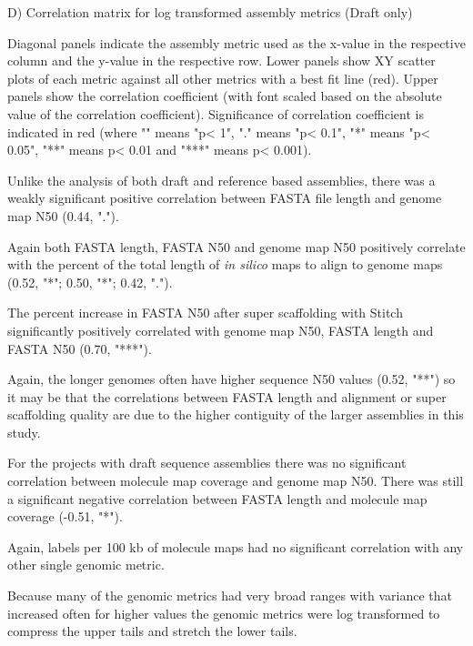 D) Correlation matrix for log transformed assembly metrics (Draft only)

Diagonal panels indicate the assembly metric used as the x-value in the respective column and the y-value in the respective row. Lower panels show XY scatter plots of each metric against all other metrics with a best fit line (red). Upper panels show the correlation coefficient (with font scaled based on the absolute value of the correlation coefficient). Significance of correlation coefficient is indicated in red (where "" means "p< 1", "." means "p< 0.1", "*" means "p< 0.05", "**" means p< 0.01 and "***" means p< 0.001).

Unlike the analysis of both draft and reference based assemblies, there was a weakly significant positive correlation between FASTA file length and genome map N50 (0.44, "."). 

Again both FASTA length, FASTA N50 and genome map N50 positively correlate with the percent of the total length of \textit{in silico} maps to align to genome maps (0.52, "*"; 0.50, "*"; 0.42, "."). 

The percent increase in FASTA N50 after super scaffolding with Stitch significantly positively correlated with genome map N50, FASTA length and FASTA N50 (0.70, "***").

Again, the longer genomes often have higher sequence N50 values (0.52, "**") so it may be that the correlations between FASTA length and alignment or super scaffolding quality are due to the higher contiguity of the larger assemblies in this study.

For the projects with draft sequence assemblies there was no significant correlation between molecule map coverage and genome map N50. There was still a significant negative correlation between FASTA length and molecule map coverage (-0.51, "*").

Again, labels per 100 kb of molecule maps had no significant correlation with any other single genomic metric.

Because many of the genomic metrics had very broad ranges with variance that increased often for higher values the genomic metrics were log transformed to compress the upper tails and stretch the lower tails.
